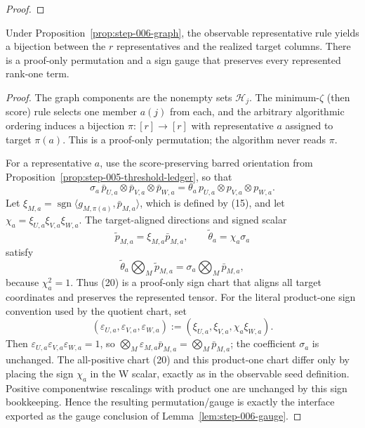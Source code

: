 \begin{proposition}
\begin{proof}
\end{proof}
\end{proposition}
\begin{lemma}\label{lem:step-006-gauge}
Under Proposition~\ref{prop:step-006-graph},
the observable representative rule yields a bijection between the \(r\)
representatives and the realized target columns. There is a proof-only
permutation and a sign gauge that preserves every represented rank-one term.

\begin{proof}
The graph components are the nonempty sets \(\mathcal H_j\). The
minimum-\(\zeta\) (then score) rule selects one member \(a(j)\) from each,
and the arbitrary algorithmic ordering induces a bijection
\(\pi:[r]\to[r]\) with representative \(a\) assigned to target
\(\pi(a)\). This is a proof-only permutation; the algorithm never reads
\(\pi\).

For a representative \(a\), use the score-preserving barred orientation from
Proposition~\ref{prop:step-005-threshold-ledger}, so that
\[
 \sigma_a\,\bar p_{U,a}\otimes\bar p_{V,a}\otimes\bar p_{W,a}
 =\theta_a\,p_{U,a}\otimes p_{V,a}\otimes p_{W,a}. \tag{19}
\]
Let \(\xi_{M,a}=\operatorname{sgn}\langle g_{M,\pi(a)},\bar p_{M,a}\rangle\),
which is defined by (15), and let \(\chi_a=\xi_{U,a}\xi_{V,a}\xi_{W,a}\).
The target-aligned directions and signed scalar
\[
 \widetilde p_{M,a}=\xi_{M,a}\bar p_{M,a},\qquad
 \widetilde\theta_a=\chi_a\sigma_a \tag{20}
\]
satisfy
\[
 \widetilde\theta_a\bigotimes_M\widetilde p_{M,a}
 =\sigma_a\bigotimes_M\bar p_{M,a}, \tag{21}
\]
because \(\chi_a^2=1\). Thus (20) is a proof-only sign chart that aligns
all target coordinates and preserves the represented tensor. For the literal
product-one sign convention used by the quotient chart, set
\[
 (\varepsilon_{U,a},\varepsilon_{V,a},\varepsilon_{W,a})
 :=(\xi_{U,a},\xi_{V,a},\chi_a\xi_{W,a}).
\]
Then \(\varepsilon_{U,a}\varepsilon_{V,a}\varepsilon_{W,a}=1\), so
\(\bigotimes_M\varepsilon_{M,a}\bar p_{M,a}
=\bigotimes_M\bar p_{M,a}\); the coefficient \(\sigma_a\) is unchanged.
The all-positive chart (20) and this product-one chart differ only by
placing the sign \(\chi_a\) in the W scalar, exactly as in the observable
seed definition. Positive componentwise rescalings with product one are
unchanged by this sign bookkeeping. Hence the resulting permutation/gauge is
exactly the interface exported as the gauge conclusion of Lemma~\ref{lem:step-006-gauge}. 

\end{proof}
\end{lemma}
